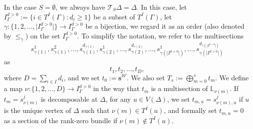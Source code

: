 \documentclass[11pt]{amsart}
\theoremstyle{definition}
\theoremstyle{remark}
\newcommand{\<}{\left<}
\renewcommand{\>}{\right>}
\numberwithin{equation}{section}
\begin{document}
    
    In the case $S=\emptyset$, we always have $\mathcal T_S \Delta=\Delta$. In this case, 
    let $I^{d>0}_{\Gamma}:=\{i\in T^I(\Gamma)\colon d_i\ge 1\}$ be a subset of $T^I(\Gamma)$, let $\gamma\colon \{1,2,\dots, \lvert I_{\Gamma}^{d>0}\rvert\}\to I_{\Gamma}^{d>0}$ be a bijection, we regard it as an order (also denoted by $\le_{\gamma}$) on the set $I^{d>0}_{\Gamma}$.
    To simplify the notation, we refer to the multisections 
$$s_{\gamma(1)}^1, s_{\gamma(1)}^2, \dots, s_{\gamma(1)}^{d_{\gamma(1)}}, s_{\gamma(2)}^1, \dots, s_{\gamma(2)}^{d_{\gamma(2)}}, \dots, s_{\gamma(\lvert I^{d>0}\rvert)}^1, \dots, s_{\gamma(\lvert I^{d>0}\rvert)}^{d_{\gamma(\lvert I^{d>0}\rvert)}}$$
as 
$$t_1,t_2,\dots,t_{D},$$
where $D=\sum_{i\in I} d_i$, and we set $t_0:=\bm{s}^{\mathcal W}$. We also set 
$T_s:=\bigoplus_{m=0}^s t_m.$ We define a map $\nu \colon \{1,2,\dots, D\} \to  I_{\Gamma}^{d>0}$ in the way that $t_m$ is a multisection of $\mathbb L_{\nu(m)}$. If $t_m=s^j_{\nu(m)}$ is decomposable at $\Delta$, for any $u\in V(\Delta)$, we set $t_{m,u}=s^j_{\nu(m),u}$ if $u$ is the unique vertex of $\Delta$ such that $\nu(m)\in T^I(u)$, and formally set $t_{m,u}=0$ as a section of the rank-zero bundle if $\nu(m)\notin T^I(u)$.
\end{document}

